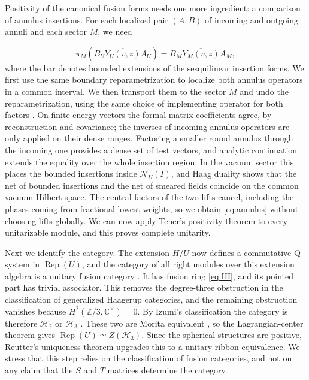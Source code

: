 \documentclass[11pt,a4paper]{article}
\DeclareMathOperator{\Rep}{Rep}
\newcommand{\HH}{\mathcal H}
\newcommand{\CC}{\mathbb C}
\newcommand{\ZZ}{\mathbb Z}
\begin{document}
Positivity of the canonical fusion forms needs one more ingredient: a
comparison of annulus insertions. For each localized pair $(A,B)$ of
incoming and outgoing annuli and each sector $M$, we need

\begin{equation}\label{eq:annulus}
 \pi_M\!\left(\overline{B_UY_U(v,z)A_U}\right)
       =\overline{B_MY_M(v,z)A_M},
\end{equation}
where the bar denotes bounded extensions of the sesquilinear insertion
forms. We first use the same boundary reparametrization to localize both
annulus operators in a common interval. We then transport them to
the sector $M$ and undo the reparametrization, using the same choice
of implementing operator for both factors
\cite[Proposition 4.17 and Theorem 9.5]{HTNet}.
On finite-energy vectors the formal matrix coefficients agree, by
reconstruction and covariance; the inverses of incoming annulus
operators are only applied on their dense ranges. Factoring a smaller
round annulus through the incoming one provides a dense set of test
vectors, and analytic continuation extends the equality over the whole
insertion region. In the vacuum sector this places the bounded
insertions inside $\mathcal N_U(I)$, and Haag duality shows that the
net of bounded insertions and the net of smeared fields coincide on
the common vacuum Hilbert space. The central factors of the two lifts
cancel, including the phases coming from fractional lowest weights, so
we obtain \eqref{eq:annulus} without choosing lifts globally. We can
now apply Tener's positivity theorem \cite[Corollary 4.6]{TenFusion}
to every unitarizable module, and this proves complete unitarity.

Next we identify the category. The extension $H/U$ now defines a
commutative Q-system in $\Rep(U)$, and the category of all right modules
over this extension algebra is a unitary fusion category \cite{Gui}.
It has fusion ring \eqref{eq:HI}, and its pointed
part has trivial associator. This removes the degree-three obstruction
in the classification of generalized Haagerup categories, and the
remaining obstruction vanishes because $H^2(\ZZ/3,\CC^\times)=0$. By
Izumi's classification the category is therefore $\HH_2$ or $\HH_3$
\cite[Theorems 5.9 and 9.1]{Izumi}. These two are Morita equivalent
\cite{GS}, so the Lagrangian-center theorem gives
$\Rep(U)\simeq Z(\HH_3)$. Since the spherical structures are positive,
Reutter's uniqueness theorem \cite{Reutter} upgrades this to a unitary
ribbon equivalence. We stress that this step relies on the
classification of fusion categories, and not on any claim that the $S$
and $T$ matrices determine the category.
\end{document}
